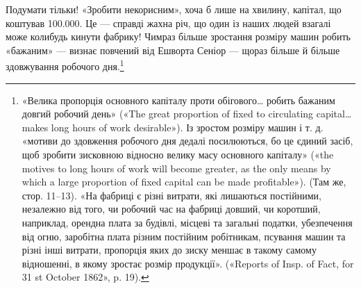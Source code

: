 Подумати тільки! «Зробити некорисним», хоча б лише на хвилину,
капітал, що коштував \num{100.000}. Це — справді
жахна річ, що один із наших людей взагалі може колибудь кинути
фабрику! Чимраз більше зростання розміру машин робить «бажаним»
— визнає повчений від Ешворта Сеніор — щораз більше
й більше здовжування робочого дня.\footnote{
«Велика пропорція основного капіталу проти обігового\dots{} робить
бажаним довгий робочий день» («The great proportion of fixed to circulating
capital\dots{} makes long hours of work desirable»). Із зростом розміру
машин і т. д. «мотиви до здовження робочого дня дедалі посилюються,
бо це єдиний засіб, щоб зробити зисковною відносно велику масу основного
капіталу» («the motives to long hours of work will become greater,
as the only means by which a large proportion of fixed capital can be
made profitable»). (Там же, стор. 11--13). «На фабриці є різні витрати,
які лишаються постійними, незалежно від того, чи робочий час на
фабриці довший, чи коротший, наприклад, орендна плата за будівлі, місцеві
та загальні податки, убезпечення від огню, заробітна плата різним
постійним робітникам, псування машин та різні інші витрати, пропорція
яких до зиску меншає в такому самому відношенні, в якому
зростає розмір продукції». («Reports of Insp. of Fact, for 31 st October
1862», p. 19).
}
